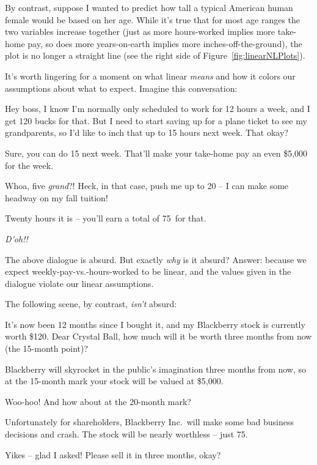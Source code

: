 By contrast, suppose I wanted to predict how tall a typical American human
female would be based on her age. While it's true that for most age ranges the
two variables increase together (just as more hours-worked implies more
take-home pay, so does more years-on-earth implies more inches-off-the-ground),
the plot is no longer a straight line (see the right side of
Figure~\ref{fig:linearNLPlots}).

It's worth lingering for a moment on what linear \textit{means} and how it
colors our assumptions about what to expect. Imagine this conversation:

\begin{dialogue}

 Hey boss, I know I'm normally only scheduled to work for 12 hours a
week, and I get 120 bucks for that. But I need to start saving up for a plane
ticket to see my grandparents, so I'd like to inch that up to 15 hours next
week. That okay?

 Sure, you can do 15 next week. That'll make your take-home
pay an even \$5,000 for the week.

  Whoa, five \textit{grand}?! Heck, in that
case, push me up to 20 -- I can make some headway on my fall tuition!

 Twenty hours it is -- you'll earn a total of 75\textcent~for
that.

 \textit{D'oh!!}

\end{dialogue}

The above dialogue is absurd. But exactly \textit{why} is it absurd? Answer:
because we expect weekly-pay-vs.-hours-worked to be linear, and the values
given in the dialogue violate our linear assumptions.

\bigskip
The following scene, by contrast, \textit{isn't} absurd:

\begin{dialogue}

 It's now been 12 months since I bought it, and my Blackberry stock
is currently worth \$120. Dear Crystal Ball, how much will it be worth three
months from now (the 15-month point)?

 Blackberry will skyrocket in the public's imagination
three months from now, so at the 15-month mark your stock will be valued at
\$5,000.

 Woo-hoo! And how about at the 20-month mark?

 Unfortunately for shareholders, Blackberry Inc.~will make
some bad business decisions and crash. The stock will be nearly worthless --
just 75\textcent.

 Yikes -- glad I asked! Please sell it in three months, okay?

\end{dialogue}

